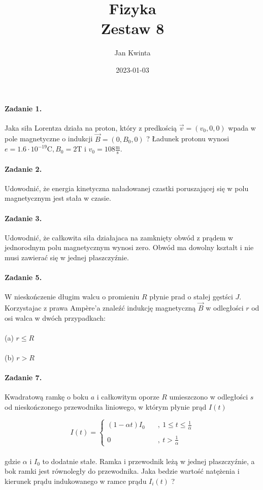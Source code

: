 \documentclass[14pt, table]{extarticle}
\title{Fizyka \\ \Large{Zestaw 8}}
\author{Jan Kwinta}
\date{2023-01-03}
\newcommand{\metr}{\textrm{m}}
\newcommand{\sekunda}{\textrm{s}}
\newcommand{\kulomb}{\textrm{C}}
\newcommand{\tesla}{\textrm{T}}
\begin{document}
\maketitle

\paragraph{Zadanie 1.}
Jaka siła Lorentza działa na proton, który z predkością $\vec{v} = (v_0, 0, 0)$ wpada w pole magnetyczne o indukcji $\vec{B} = (0, B_0, 0)$ ? Ładunek protonu wynosi $e = 1.6 \cdot 10^{-19} \kulomb, B_0 = 2 \tesla$ i $v_0 = 108 \frac{\metr}{\sekunda}$.


\newpage
\paragraph{Zadanie 2.}
Udowodnić, że energia kinetyczna naładowanej czastki poruszającej się w polu magnetycznym jest stała w czasie.


\newpage
\paragraph{Zadanie 3.}
Udowodnić, że całkowita siła działajaca na zamknięty obwód z prądem w jednorodnym polu magnetycznym wynosi zero. Obwód ma dowolny kształt i nie musi zawierać się w jednej płaszczyźnie. 


\newpage
\paragraph{Zadanie 5.}
W nieskończenie długim walcu o promieniu $R$ płynie prad o stałej gęstści $J$. Korzystajac z prawa Ampère’a znaleźć indukcję magnetyczną $\vec{B}$ w odległości $r$ od osi walca w dwóch przypadkach: \\ \\
(a) $r \leq R$ \\ \\
(b) $r > R$


\newpage
\paragraph{Zadanie 7.}
Kwadratową ramkę o boku $a$ i całkowitym oporze $R$ umieszczono w odległości $s$ od
nieskończonego przewodnika liniowego, w którym płynie prąd $I(t)$

\begin{equation*}
I(t) = \left\{
        \begin{array}{ll}
            (1 - \alpha t) I_0 \quad &\text{,} \, \ 1 \leq t \leq \frac{1}{\alpha} \\
            \\
            0 \quad &\text{,} \, \ t > \frac{1}{\alpha}
        \end{array}
    \right.
\end{equation*} \\
gdzie $\alpha$ i $I_0$ to dodatnie stałe. Ramka i przewodnik leżą w jednej płaszczyźnie, a bok ramki jest równoległy do przewodnika. Jaka bedzie wartość natężenia i kierunek prądu indukowanego w ramce prądu $I_i(t)$ ?
\end{document}
